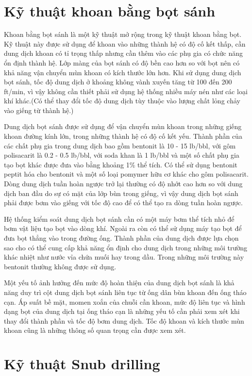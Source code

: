 \documentclass[13pt,a4paper]{article}
\begin{document}
\section{Kỹ thuật khoan bằng bọt sánh}
	Khoan bằng bọt sánh là một kỹ thuật mở rộng trong kỹ thuật khoan bằng bọt. Kỹ thuật này được sử dụng để khoan vào những thành hệ có độ cố kết thấp, cần dung dịch khoan có tỉ trọng thấp nhưng cần thêm vào các phụ gia có chức năng ổn định thành hệ. Lớp màng của bọt sánh có độ bền cao hơn so với bọt nên có khả năng vận chuyển mùn khoan có kích thước lớn hơn. Khi sử dụng dung dịch bọt sánh, tốc độ dung dịch ở khoảng không vành xuyến tăng từ 100 đến 200 ft/min, vì vậy không cần thiết phải sử dụng hệ thống nhiều máy nén như các loại khí khác.(Có thể thay đổi tốc độ dung dịch tùy thuộc vào lượng chất lỏng chảy vào giếng từ thành hệ.)\par
	Dung dịch bọt sánh được sử dụng để vận chuyển mùn khoan trong những giếng khoan đường kính lớn, trong những thành hệ có độ cố kết yếu. Thành phần của các chất phụ gia trong dung dịch bao gồm bentonit là 10 - 15 lb/bbl, với gôm polisacarit là 0.2 - 0.5 lb/bbl, với soda khan là 1 lb/bbl và một số chất phụ gia tạo bọt khác được đưa vào bằng khoảng 1\% thể tích. Có thể sử dụng bentonit peptit hóa cho bentonit và một số loại pomymer hữu cơ khác cho gôm polisacarit. Dòng dung dịch tuần hoàn ngược trở lại thường có độ nhớt cao hơn so với dung dịch ban đầu do sự có mặt của lớp bùn trong giếng, vì vậy dung dịch bọt sánh phải được bơm vào giếng với tốc độ cao để có thể tạo ra dòng tuần hoàn ngược. \par
	Hệ thống kiểm soát dung dịch bọt sánh cần có một máy bơm thể tích nhỏ để bơm vật liệu tạo bọt vào dòng khí. Ngoài ra còn có thể sử dụng máy tạo bọt để đưa bọt thẳng vào trong đường ống. Thành phần của dung dịch được lựa chọn sao cho có thể cung cấp khả năng ổn định cho dung dịch trong những môi trường khác nhiệt như nước vỉa chứa muối hay trong dầu. Trong những môi trường này bentonit thường không được sử dụng.\par
	Một yếu tố ảnh hưởng đến mức độ hoàn thiện của dung dịch bọt sánh là khả năng duy trì cột dung dịch bọt sánh liên tục từ ống dân bùn khoan đến ống tháo cạn. Áp suất bề mặt, momen xoắn của chuỗi cần khoan, mức độ liên tục và hình dạng bọt của dung dịch tại ống tháo cạn là những yếu tố cần phải xem xét khi thay đổi thành phần và tốc độ bơm dung dịch. Tốc độ khoan và kích thước mùn khoan cũng là những thông số quan trọng cần được xem xét.
\section{Kỹ thuật Snub drilling}
\end{document}
